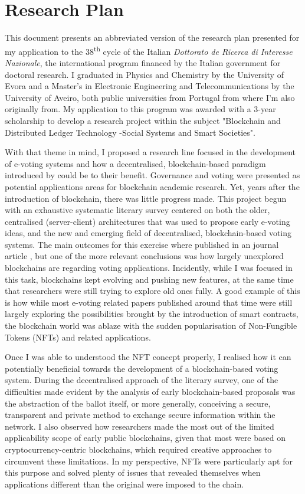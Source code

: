 \documentclass[../main.tex]{subfiles}
\begin{document}
\section{Research Plan}
\label{sec:summed_research_plan}
This document presents an abbreviated version of the research plan presented for my application to the 38\textsuperscript{th} cycle of the Italian \textit{Dottorato de Ricerca di Interesse Nazionale}, the international program financed by the Italian government for doctoral research. I graduated in Physics and Chemistry by the University of Evora and a Master's in Electronic Engineering and Telecommunications by the University of Aveiro, both public universities from Portugal from where I'm also originally from. My application to this program was awarded with a 3-year scholarship to develop a research project within the subject "Blockchain and Distributed Ledger Technology -Social Systems and Smart Societies".
\par
With that theme in mind, I proposed a research line focused in the development of e-voting systems and how a decentralised, blockchain-based paradigm introduced by could be to their benefit. Governance and voting were presented as potential applications areas for blockchain academic research. Yet, years after the introduction of blockchain, there was little progress made. This project begun with an exhaustive systematic literary survey centered on both the older, centralised (server-client) architectures that was used to propose early e-voting ideas, and the new and emerging field of decentralised, blockchain-based voting systems. The main outcomes for this exercise where published in an journal article \cite{Almeida2023}, but one of the more relevant conclusions was how largely unexplored blockchains are regarding voting applications. Incidently, while I was focused in this task, blockchains kept evolving and pushing new features, at the same time that researchers were still trying to explore old ones fully. A good example of this is how while most e-voting related papers published around that time were still largely exploring the possibilities brought by the introduction of smart contracts, the blockchain world was ablaze with the sudden popularisation of Non-Fungible Tokens (NFTs) and related applications.
\par
Once I was able to understood the NFT concept properly, I realised how it can potentially beneficial towards the development of a blockchain-based voting system. During the decentralised approach of the literary survey, one of the difficulties made evident by the analysis of early blockchain-based proposals was the abstraction of the ballot itself, or more generally, conceiving a secure, transparent and private method to exchange secure information within the network. I also observed how researchers made the most out of the limited applicability scope of early public blockchains, given that most were based on cryptocurrency-centric blockchains, which required creative approaches to circumvent these limitations. In my perspective, NFTs were particularly apt for this purpose and solved plenty of issues that revealed themselves when applications different than the original were imposed to the chain.
\end{document}
